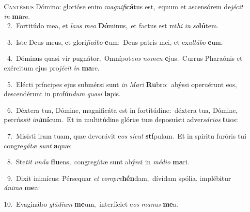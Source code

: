 \lettrine{\initial\textcolor{\initialcolor}{C}}{antémus} Dómino: glorióse enim \textit{ma}\-\textit{gni}\textit{fi}\textbf{cá}tus est,~\star equum et ascensórem de\-\textit{jé}\-\textit{cit} \textit{in} \textbf{ma}\-re.\\
{\numbfont\textcolor{\numbcolor}{~2.}}~Fortitúdo mea, et \textit{laus} \textit{me}\-\textit{a} \textbf{Dó}\-minus,~\star et factus est mi\textit{hi} \textit{in} \textit{sa}\-\textbf{lú}tem.\par
{\numbfont\textcolor{\numbcolor}{~3.}}~Iste Deus meus, et glori\-\textit{fi}\-\textit{cá}\textit{bo} \textbf{e}\-um:~\star Deus patris mei, et ex\-\textit{al}\-\textit{tá}\textit{bo} \textbf{e}\-um.\par
{\numbfont\textcolor{\numbcolor}{~4.}}~Dóminus quasi vir pugnátor,~\dagger Omnípot\textit{ens} \textit{no}\-\textit{men} \textbf{e}\-jus.~\star Currus Pharaónis et exércitum ejus pro\-\textit{jé}\-\textit{cit} \textit{in} \textbf{ma}\-re.\par
{\numbfont\textcolor{\numbcolor}{~5.}}~Elécti príncipes ejus submérsi sunt \textit{in} \textit{Ma}\-\textit{ri} \textbf{Ru}\-bro:~\star abýssi operuérunt eos, descendérunt in profún\textit{dum} \textit{qua}\-\textit{si} \textbf{la}\-pis.\par
{\numbfont\textcolor{\numbcolor}{~6.}}~Déxtera tua, Dómine, magnificáta est in fortitúdine:~\dagger déxtera tua, Dómine, percús\textit{sit} \textit{in}\-\textit{i}\textbf{mí}cum.~\star Et in multitúdine glóriæ tuæ deposuísti adver\-\textit{sá}\-\textit{ri}\textit{os} \textbf{tu}\-os:\par
{\numbfont\textcolor{\numbcolor}{~7.}}~Misísti iram tuam, quæ devorávit e\textit{os} \textit{sic}\-\textit{ut} \textbf{stí}\-pulam.~\star Et in spíritu furóris tui congre\-\textit{gá}\-\textit{tæ} \textit{sunt} \textbf{a}\-quæ:\par
{\numbfont\textcolor{\numbcolor}{~8.}}~Ste\textit{tit} \textit{un}\-\textit{da} \textbf{flu}\-ens,~\star congregátæ sunt abýssi in \textit{mé}\-\textit{di}\textit{o} \textbf{ma}\-ri.\par
{\numbfont\textcolor{\numbcolor}{~9.}}~Dixit inimícus: Pérsequar \textit{et} \textit{com}\-\textit{pre}\textbf{hén}dam,~\star dívidam spólia, implébitur \textit{á}\-\textit{ni}\textit{ma} \textbf{me}\-a:\par
{\numbfont\textcolor{\numbcolor}{10.}}~Evaginábo \textit{glá}\-\textit{di}\textit{um} \textbf{me}\-um,~\star interfíciet e\textit{os} \textit{ma}\-\textit{nus} \textbf{me}\-a.\par
